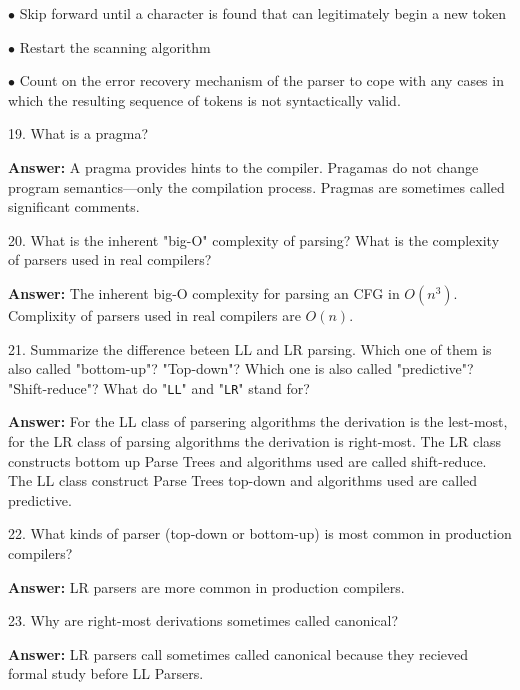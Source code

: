 \vskip 1mm
\qquad$\bullet$ Skip forward until a character is found that can legitimately begin a new token

\vskip 1mm
\qquad$\bullet$ Restart the scanning algorithm

\vskip 1mm
\qquad$\bullet$ Count on the error recovery mechanism of the parser to cope with any cases in which the resulting sequence of tokens is not syntactically valid.

\filbreak
\vskip 1cm

19. What is a pragma?

\vskip 3mm
{\bf Answer:} A pragma provides hints to the compiler. Pragamas do not change program semantics---only the compilation process. Pragmas are sometimes called significant comments.

\filbreak
\vskip 1cm

20. What is the inherent "big-O" complexity of parsing? What is the complexity of parsers used in real compilers?

\vskip 3mm
{\bf Answer:} The inherent big-O complexity for parsing an CFG in $O(n^3)$. Complixity of parsers used in real compilers are $O(n)$.

\filbreak
\vskip 1cm

21. Summarize the difference beteen LL and LR parsing. Which one of them is also called "bottom-up"? "Top-down"? Which one is also called "predictive"? "Shift-reduce"? What do "{\tt LL}" and "{\tt LR}" stand for?

\vskip 3mm
{\bf Answer:} For the LL class of parsering algorithms the derivation is the lest-most, for the LR class of parsing algorithms the derivation is right-most. The LR class constructs bottom up Parse Trees and algorithms used are called shift-reduce. The LL class construct Parse Trees top-down and algorithms used are called predictive.

\filbreak
\vskip 1cm

22. What kinds of parser (top-down or bottom-up) is most common in production compilers?

\vskip 3mm
{\bf Answer:} LR parsers are more common in production compilers.

\filbreak
\vskip 1cm

23. Why are right-most derivations sometimes called canonical?

\vskip 3mm
{\bf Answer:} LR parsers call sometimes called canonical because they recieved formal study before LL Parsers.

\filbreak
\vskip 1cm

